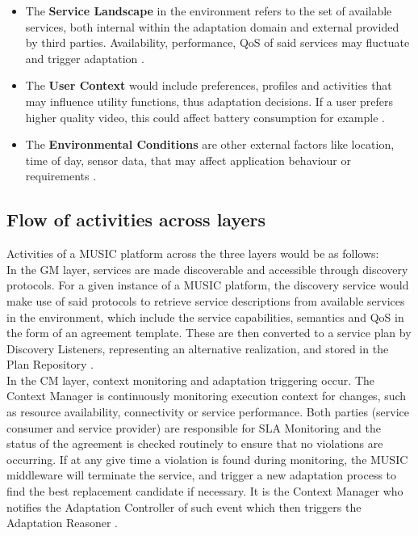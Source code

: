 \documentclass[conference]{IEEEtran}
\begin{document}
\begin{itemize}
	\item  The \textbf{Service Landscape} in the environment refers to the set of available services, both internal within the adaptation domain and external provided by third parties. Availability, performance, QoS of said services may fluctuate and trigger adaptation \cite{MUSIC_pdf}.

	\item  The \textbf{User Context} would include preferences, profiles and activities that may influence utility functions, thus adaptation decisions. If a user prefers higher quality video, this could affect battery consumption for example \cite{MUSIC_pdf}.

	\item  The \textbf{Environmental Conditions} are other external factors like location, time of day, sensor data, that may affect application behaviour or requirements \cite{MUSIC_pdf}.
\end{itemize}

\subsection{\textbf{Flow of activities across layers}}
Activities of a MUSIC platform across the three layers would be as follows:\\

In the GM layer, services are made discoverable and accessible through discovery protocols. For a given instance of a MUSIC platform, the discovery service would make use of said protocols to retrieve service descriptions from available services in the environment, which include the service capabilities, semantics and QoS in the form of an agreement template. These are then converted to a service plan by Discovery Listeners, representing an alternative realization, and stored in the Plan Repository \cite{MUSIC_pdf}.\\

In the CM layer, context monitoring and adaptation triggering occur. The Context Manager is continuously monitoring execution context for changes, such as resource availability, connectivity or service performance. Both parties (service consumer and service provider) are responsible for SLA Monitoring and the status of the agreement is checked routinely to ensure that no violations are occurring. If at any give time a violation is found during monitoring, the MUSIC middleware will terminate the service, and trigger a new adaptation process to find the best replacement candidate if necessary. It is the Context Manager who notifies the Adaptation Controller of such event which then triggers the Adaptation Reasoner \cite{MUSIC_pdf}.\\
\end{document}
